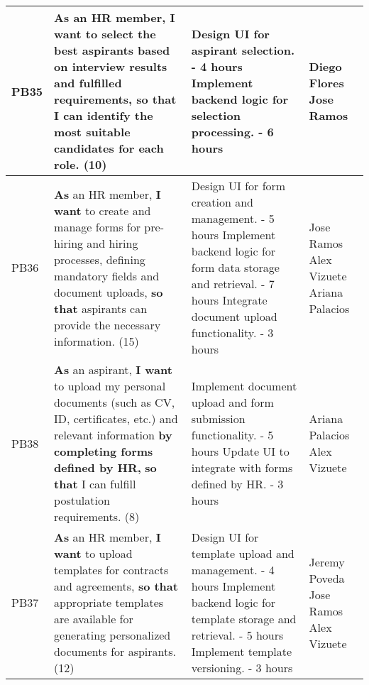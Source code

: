 \documentclass{scrreprt}
\begin{document}
\begin{longtable}{|p{1.5cm}|p{5.5cm}|p{4.5cm}|p{3cm}|}
	PB35 & \textbf{As} an HR member, \textbf{I want} to select the best aspirants based on interview results and fulfilled requirements, \textbf{so that} I can identify the most suitable candidates for each role. (10) &
	
	Design UI for aspirant selection. - 4 hours \newline
	Implement backend logic for selection processing. - 6 hours &
	Diego Flores \newline
	Jose Ramos \\ \hline
	
	PB36 & \textbf{As} an HR member, \textbf{I want} to create and manage forms for pre-hiring and hiring processes, defining mandatory fields and document uploads, \textbf{so that} aspirants can provide the necessary information. (15) &
	
	Design UI for form creation and management. - 5 hours \newline
	Implement backend logic for form data storage and retrieval. - 7 hours \newline
	Integrate document upload functionality. - 3 hours &
	Jose Ramos \newline
	Alex Vizuete \newline
	Ariana Palacios \\ \hline
	
	PB38 & \textbf{As} an aspirant, \textbf{I want} to upload my personal documents (such as CV, ID, certificates, etc.) and relevant information \textbf{by completing forms defined by HR,} \textbf{so that} I can fulfill postulation requirements. (8) &
	
	Implement document upload and form submission functionality. - 5 hours \newline
	Update UI to integrate with forms defined by HR. - 3 hours &
	Ariana Palacios \newline
	Alex Vizuete \\ \hline
	
	PB37 & \textbf{As} an HR member, \textbf{I want} to upload templates for contracts and agreements, \textbf{so that} appropriate templates are available for generating personalized documents for aspirants. (12) &
	
	Design UI for template upload and management. - 4 hours \newline
	Implement backend logic for template storage and retrieval. - 5 hours \newline
	Implement template versioning. - 3 hours &
	Jeremy Poveda \newline
	Jose Ramos \newline
	Alex Vizuete \\ \hline
	

\end{longtable}
\end{document}
